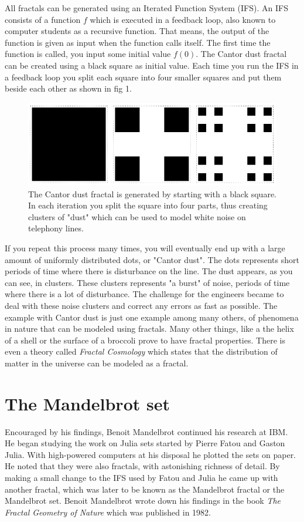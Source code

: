 \documentclass{article}
\begin{document}
All fractals can be generated using an Iterated Function System (IFS). An IFS consists of a function $f$ which is executed in a feedback loop, also known to computer students as a recursive function. That means, the output of the function is given as input when the function calls itself. The first time the function is called, you input some initial value $f(0)$\cite{fisher}. The Cantor dust fractal can be created using a black square as initial value. Each time you run the IFS in a feedback loop you split each square into four smaller squares and put them beside each other as shown in fig 1. 
\begin{figure}[ht!]
\centering
\includegraphics[width=120mm]{cantordust.png}
\caption{The Cantor dust fractal is generated by starting with a black square. In each iteration you split the square into four parts, thus creating clusters of "dust" which can be used to model white noise on telephony lines.\label{overflow}}
\end{figure}
If you repeat this process many times, you will eventually end up with a large amount of uniformly distributed dots, or "Cantor dust". The dots represents short periods of time where there is disturbance on the line. The dust appears, as you can see, in clusters. These clusters represents "a burst" of noise, periods of time where there is a lot of disturbance. The challenge for the engineers became to deal with these noise clusters and correct any errors as fast as possible\cite{pritchard}. The example with Cantor dust is just one example among many others, of phenomena in nature that can be modeled using fractals. Many other things, like a the helix of a shell or the surface of a broccoli prove to have fractal properties. There is even a theory called \textit{Fractal Cosmology} which states that the distribution of matter in the universe can be modeled as a fractal.
\section{The Mandelbrot set}
Encouraged by his findings, Benoit Mandelbrot continued his research at IBM. He began studying the work on Julia sets started by Pierre Fatou and Gaston Julia. With high-powered computers at his disposal he plotted the sets on paper. He noted that they were also fractals, with astonishing richness of detail. By making a small change to the IFS used by Fatou and Julia he came up with another fractal, which was later to be known as the Mandelbrot fractal or the Mandelbrot set. Benoit Mandelbrot wrote down his findings in the book \textit{The Fractal Geometry of Nature} which was published in 1982\cite{ibm}.
\end{document}
